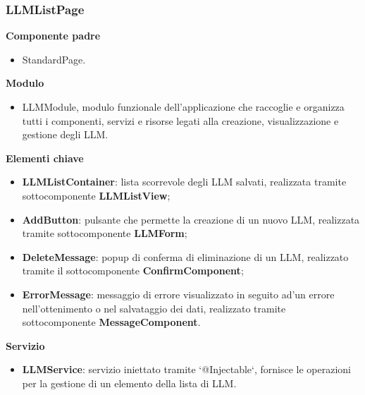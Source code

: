 \subsubsection{LLMListPage}
\textbf{Componente padre}
\begin{itemize}
    \item StandardPage.
\end{itemize}
\textbf{Modulo}
\begin{itemize}
    \item LLMModule, modulo funzionale dell'applicazione che raccoglie e organizza tutti i componenti, servizi e risorse legati alla creazione, visualizzazione e gestione degli LLM.
\end{itemize}
\textbf{Elementi chiave}
\begin{itemize}
    \item \textbf{LLMListContainer}: lista scorrevole degli LLM salvati, realizzata tramite sottocomponente \textbf{LLMListView};
    \item \textbf{AddButton}: pulsante che permette la creazione di un nuovo LLM, realizzata tramite sottocomponente \textbf{LLMForm};
    \item \textbf{DeleteMessage}: popup di conferma di eliminazione di un LLM, realizzato tramite il sottocomponente \textbf{ConfirmComponent};
    \item \textbf{ErrorMessage}: messaggio di errore visualizzato in seguito ad'un errore nell'ottenimento o nel salvataggio dei dati, realizzato tramite sottocomponente \textbf{MessageComponent}.
\end{itemize}
\textbf{Servizio}
\begin{itemize}
    \item \textbf{LLMService}: servizio iniettato tramite `@Injectable`, fornisce le operazioni per la gestione di un elemento della lista di LLM.
\end{itemize}
